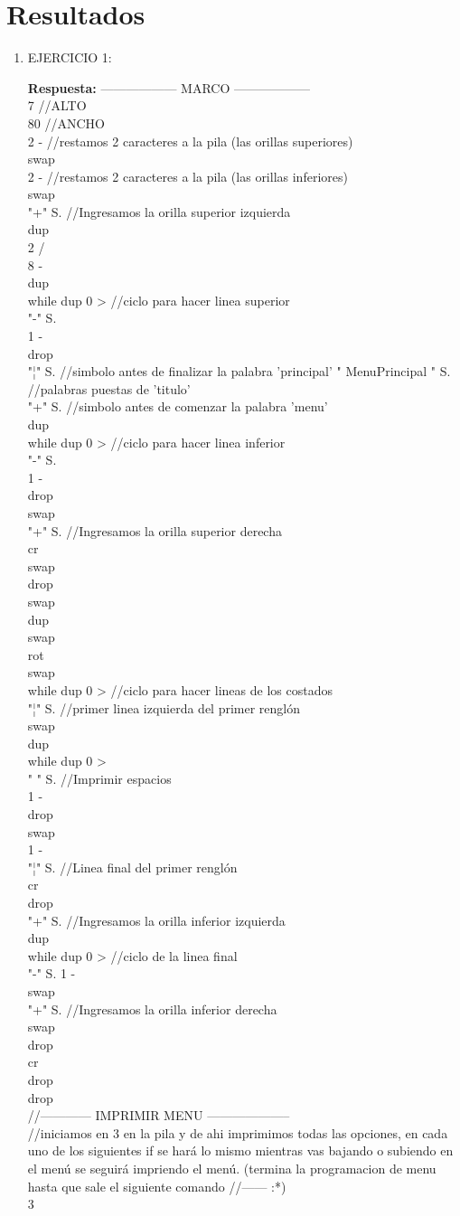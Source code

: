 \documentclass[conference]{IEEEtran}
\begin{document}
\section{Resultados}
\begin{enumerate}
\item  EJERCICIO 1:\\
	\begin{center}
	\textbf{Respuesta: }  ------------------ MARCO ------------------ \\ 7        	//ALTO \\ 80       	//ANCHO \\ 2 - //restamos 2 caracteres a la pila (las orillas superiores) \\ swap \\ 2 - //restamos 2 caracteres a la pila (las orillas inferiores) \\ swap \\ "+" S. //Ingresamos la orilla superior izquierda \\ dup \\ 2 / \\ 8 - \\ dup \\ while dup 0 > //ciclo para hacer linea superior \\  "-" S. \\  1 - \\ drop \\ "¦" S. //simbolo antes de finalizar la palabra 'principal' " MenuPrincipal " S. //palabras puestas de 'titulo' \\ "+" S. //simbolo antes de comenzar la palabra 'menu' \\ dup \\ while dup 0 > //ciclo para hacer linea inferior \\  "-" S. \\  1 - \\ drop \\ swap \\ "+" S. //Ingresamos la orilla superior derecha \\ cr \\ swap \\ drop \\ swap \\ dup \\ swap \\ rot \\ swap \\ while dup 0 > //ciclo para hacer lineas de los costados \\   "¦" S. //primer linea izquierda del primer renglón \\   swap \\   dup \\   while dup 0 > \\   " " S. //Imprimir espacios \\   1 - \\   drop \\   swap \\   1 - \\   "¦" S. //Linea final del primer renglón \\   cr \\ drop \\ "+" S. //Ingresamos la orilla inferior izquierda \\ dup \\ while dup 0 > //ciclo de la linea final \\  "-" S. 1 - \\ swap \\ "+" S. //Ingresamos la orilla inferior derecha \\ swap \\ drop \\ cr \\ drop \\ drop \\ //------------ IMPRIMIR MENU -------------------- \\  //iniciamos en 3 en la pila y de ahi imprimimos todas las opciones, en cada uno de los siguientes if se hará lo mismo mientras vas bajando o subiendo en el menú se seguirá impriendo el menú. (termina la programacion de menu hasta que sale el siguiente comando //------ :*) \\ 3  \\ 
\end{center}
\end{enumerate}
\end{document}
